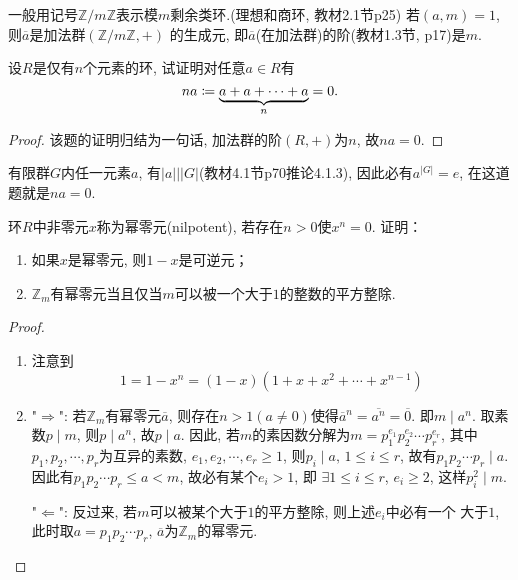 \begin{remark}
    一般用记号$\mathbb{Z}/m\mathbb{Z}$表示模$m$剩余类环.(理想和商环, 教材2.1节p25)
若$(a, m) = 1$, 则$\overline{a}$是加法群$(\mathbb{Z}/m\mathbb{Z}, +)$
的生成元, 即$\overline{a}$(在加法群)的阶(教材1.3节, p17)是$m$.
\end{remark}

\begin{problem}
    设$R$是仅有$n$个元素的环, 试证明对任意$a \in R$有
\[
    na \mathrel{\coloneqq} \underbrace{a + a + \cdots + a}_n = 0.
\]
\end{problem}
    
\begin{proof}
    该题的证明归结为一句话, 加法群的阶$(R, +)$为$n$, 故$na = 0$.


\end{proof}

\begin{remark}
    有限群$G$内任一元素$a$, 有$|a| \Big| |G|$(教材4.1节p70推论4.1.3),
因此必有$a^{|G|} = e$, 在这道题就是$na = 0$.
\end{remark}

\begin{problem}
    环$R$中非零元$x$称为幂零元(nilpotent), 若存在$n > 0$使$x^n = 0$. 证明：
\begin{enumerate}[(1)]
    \item 如果$x$是幂零元, 则$1 - x$是可逆元；
    \item $\mathbb{Z}_m$有幂零元当且仅当$m$可以被一个大于$1$的整数的平方整除.
\end{enumerate}
\end{problem}

\begin{proof}
\begin{enumerate}[(1)]
    \item 注意到
\[
    1 = 1 - x^n = (1 - x)(1 + x + x^2 + \cdots + x^{n - 1})
\]
    \item "$\Rightarrow$": 若$\mathbb{Z}_m$有幂零元$\overline{a}$,
    则存在$n > 1(a \neq 0)$使得$\overline{a}^n = \overline{a^n} = \overline{0}$.
    即$m \mid a^n$. 取素数$p \mid m$, 则$p \mid a^n$, 故$p \mid a$.
    因此, 若$m$的素因数分解为$m = p_1^{e_1}p_2^{e_2}\cdots p_r^{e_r}$,
    其中$p_1, p_2, \cdots, p_r$为互异的素数, $e_1, e_2, \cdots, e_r \geqslant 1$,
    则$p_i \mid a,\, 1 \leqslant i \leqslant r$, 故有$p_1p_2\cdots p_r \mid a$.
    因此有$p_1p_2\cdots p_r \leqslant a < m$, 故必有某个$e_i > 1$, 即
    $\exists 1 \leqslant i \leqslant r$, $e_i \geqslant 2$, 这样$p_i^2 \mid m$.

    "$\Leftarrow$": 反过来, 若$m$可以被某个大于$1$的平方整除, 则上述$e_i$中必有一个
    大于$1$, 此时取$a = p_1p_2\cdots p_r$, $\overline{a}$为$\mathbb{Z}_m$的幂零元.
\end{enumerate}
\end{proof}


